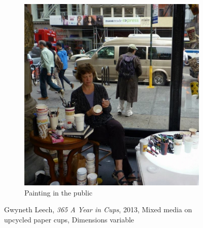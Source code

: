 \begin{figure}[h!]
\begin{subfigure}{.48\textwidth}
  \includegraphics[width=\linewidth]{graphics/Gwyneth-Leech-cup3.jpg}
  \caption{Painting in the public}
  \label{fig:GwynethLeech_Public}
\end{subfigure}
\caption{Gwyneth Leech, \textit{365 A Year in Cups}, 2013, Mixed media on upcycled paper cups, Dimensions variable}
\label{fig:GwynethLeech_CoffeeCups}
\end{figure}

